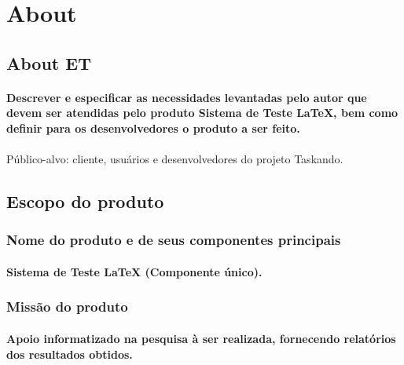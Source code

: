 \documentclass{article}
\begin{document}
\newpage

\newpage

\newpage


\newpage

\section{About}
	\subsection{About ET}
		\paragraph{Descrever e especificar as necessidades levantadas pelo autor que devem ser atendidas pelo produto Sistema de Teste LaTeX, bem como definir para os desenvolvedores o produto a ser feito.}

\paragraph{}Público-alvo: cliente, usuários e desenvolvedores do projeto Taskando.
	\subsection{Escopo do produto}
		\subsubsection{Nome do produto e de seus componentes principais}
			\paragraph{Sistema de Teste LaTeX (Componente único). }
		\subsubsection{Missão do produto}
			\paragraph{Apoio informatizado na pesquisa à ser realizada, fornecendo relatórios dos resultados obtidos.}
			
\end{document}
